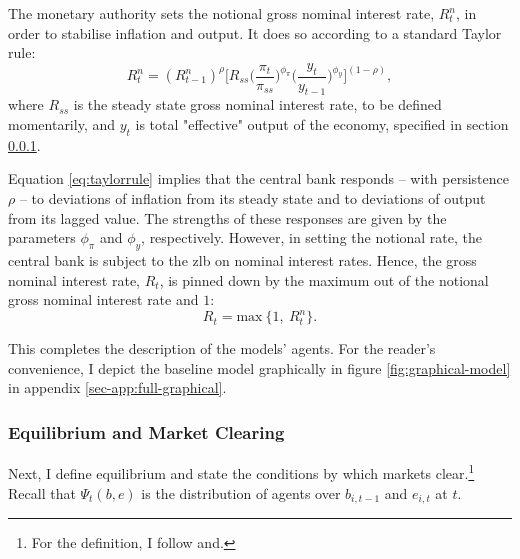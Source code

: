 \documentclass[12pt]{article} %
\numberwithin{equation}{section} %
\begin{document}
The monetary authority sets the notional gross nominal interest rate, $R_{t}^n$, in order to stabilise inflation and output. It does so according to a standard Taylor rule:
\begin{equation}
    R_{t}^n = ( R_{t-1}^n )^{\rho} \Bigg[ R_{ss} \Bigg( \frac{\pi_t}{\pi_{ss}} \Bigg)^{\phi_{\pi}} \Bigg( \frac{y_t}{y_{t-1}} \Bigg)^{\phi_y} \Bigg]^{(1-\rho)}, \label{eq:taylorrule}
\end{equation}
where $R_{ss}$ is the steady state gross nominal interest rate, to be defined momentarily, and $y_t$ is total "effective" output of the economy, specified in section \ref{sec:model-eq}.

Equation \eqref{eq:taylorrule} implies that the central bank responds -- with persistence $\rho$ -- to deviations of inflation from its steady state and to deviations of output from its lagged value. The strengths of these responses are given by the parameters $\phi_{\pi}$ and $\phi_y$, respectively. However, in setting the notional rate, the central bank is subject to the \Gls{zlb} on nominal interest rates. Hence, the gross nominal interest rate, $R_t$, is pinned down by the maximum out of the notional gross nominal interest rate and $1$: 
\begin{equation}
    R_t = \text{max} \ \{ 1, \ R_{t}^n \}. \label{eq:zlb}
\end{equation}


This completes the description of the models' agents. For the reader's convenience, I depict the baseline model graphically in figure \ref{fig:graphical-model} in appendix \ref{sec-app:full-graphical}.

\subsubsection{Equilibrium and Market Clearing}
\label{sec:model-eq}

Next, I define equilibrium and state the conditions by which markets clear.\footnote{For the definition, I follow \textcite{gl2017} and.} Recall that $\Psi_t (b,e)$ is the distribution of agents over $b_{i,t-1}$ and $e_{i,t}$ at $t$.
\end{document}
